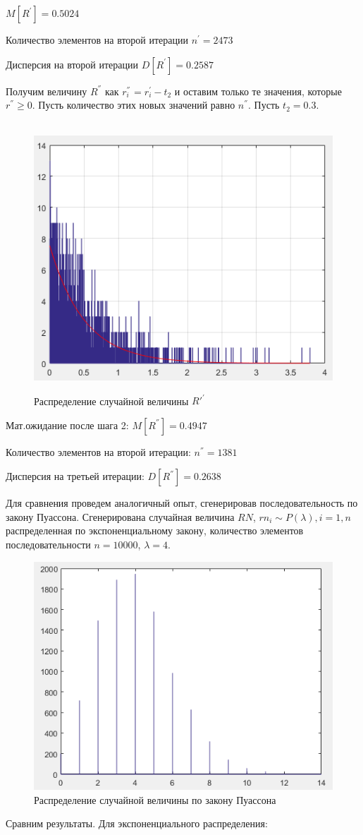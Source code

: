 $M[R^{'}]= 0.5024$

Количество элементов на второй итерации $n^{'}=2473$

Дисперсия на второй итерации $D[R^{'}] = 0.2587 $

Получим величину $R^{''}$ как $r_{i}^{''}{}^ {}=r_{i}^{'}-t_{2}$
и оставим только те значения, которые $r^{''}\geq0$. Пусть количество
этих новых значений равно $n^{''}$. Пусть $t_{2}=0.3.$ 
\begin{figure}[h]
	\centering\
	\includegraphics[width=0.4\linewidth]{img/kich_bur/image4.png}
	\caption{Распределение случайной величины $R'^{'}$ }
	\label{fig:img4}
\end{figure}

Мат.ожидание после шага 2: $M[R^{''}]= 0.4947 $

Количество элементов на второй итерации: $n^{''}= 1381 $

Дисперсия на третьей итерации: $D[R^{''}]= 0.2638 $

Для сравнения проведем аналогичный опыт, сгенерировав последовательность
по закону Пуассона. Сгенерирована случайная величина $ RN $, $rn_{i}\sim P(\lambda),i=1,n$ распределенная по экспоненциальному закону, количество элементов последовательности
$n=10000$, $\lambda=4$.
 
\begin{figure}[h]
	\centering
	\includegraphics[width=0.4\linewidth]{img/kich_bur/image5.png} 
	\caption{Распределение случайной величины по закону Пуассона}
	\label{fig:img5}
\end{figure}

Сравним результаты. Для экспоненциального распределения: 

